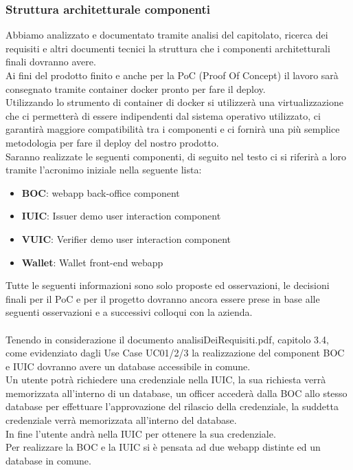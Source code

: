 \subsubsection{Struttura architetturale componenti}
Abbiamo analizzato e documentato tramite analisi del capitolato, ricerca dei requisiti e altri documenti tecnici la struttura che i componenti architetturali finali dovranno avere.\\
Ai fini del prodotto finito e anche per la PoC (Proof Of Concept) il lavoro sarà consegnato tramite container docker pronto per fare il deploy.\\
Utilizzando lo strumento di container di docker si utilizzerà una virtualizzazione che ci permetterà di essere indipendenti dal sistema operativo utilizzato, ci garantirà maggiore compatibilità tra i componenti e ci fornirà una più semplice metodologia per fare il deploy del nostro prodotto.\\
Saranno realizzate le seguenti componenti, di seguito nel testo ci si riferirà a loro tramite l'acronimo iniziale nella seguente lista:
\begin{itemize}
	\item \textbf{BOC}: webapp back-office component
	\item \textbf{IUIC}: Issuer demo user interaction component 
	\item \textbf{VUIC}: Verifier demo user interaction component 
	\item \textbf{Wallet}: Wallet front-end webapp
\end{itemize}
Tutte le seguenti informazioni sono solo proposte ed osservazioni, le decisioni finali per il PoC e per il progetto dovranno ancora essere prese in base alle seguenti osservazioni e a successivi colloqui con la azienda.\\
\\
Tenendo in considerazione il documento analisiDeiRequisiti.pdf, capitolo 3.4, come evidenziato dagli Use Case UC01/2/3 la realizzazione
del component BOC e IUIC dovranno avere un database accessibile in comune.\\
Un utente potrà richiedere una credenziale nella IUIC, la sua richiesta verrà memorizzata all'interno di un database, un officer accederà
dalla BOC allo stesso database per effettuare l'approvazione del rilascio della credenziale, la suddetta credenziale verrà memorizzata all'interno del database.\\
In fine l'utente andrà nella IUIC per ottenere la sua credenziale.\\
Per realizzare la BOC e la IUIC si è pensata ad due webapp distinte ed un database in comune.\\
